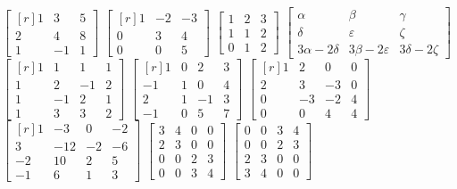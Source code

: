 \begin{tasks}[
    start=108,
    style=enumerate,
    label-offset = 5mm,
    ]
    \task $\begin{bmatrix*}[r]1 & 3 & 5 \\ 2 & 4 & 8 \\ 1 & -1 & 1\end{bmatrix*}$
    \task $\begin{bmatrix*}[r]1 & -2 & -3 \\ 0 & 3 & 4 \\ 0 & 0 & 5\end{bmatrix*}$
    \task $\begin{bmatrix*}1 & 2 & 3 \\ 1 & 1 & 2 \\ 0 & 1 & 2\end{bmatrix*}$
    \task $\begin{bmatrix*}\alpha & \beta & \gamma \\ \delta & \varepsilon & \zeta \\ 3 \alpha-2 \delta & 3 \beta-2 \varepsilon & 3 \delta-2 \zeta\end{bmatrix*}$
    \task $\begin{bmatrix*}[r]1 & 1 & 1 & 1 \\ 1 & 2 & -1 & 2 \\ 1 & -1 & 2 & 1 \\ 1 & 3 & 3 & 2\end{bmatrix*}$
    \task $\begin{bmatrix*}[r]1 & 0 & 2 & 3 \\ -1 & 1 & 0 & 4 \\ 2 & 1 & -1 & 3 \\ -1 & 0 & 5 & 7\end{bmatrix*}$
    \task $\begin{bmatrix*}[r]1 & 2 & 0 & 0 \\ 2 & 3 & -3 & 0 \\ 0 & -3 & -2 & 4 \\ 0 & 0 & 4 & 4\end{bmatrix*}$
    \task $\begin{bmatrix*}[r]1 & -3 & 0 & -2 \\ 3 & -12 & -2 & -6 \\ -2 & 10 & 2 & 5 \\ -1 & 6 & 1 & 3\end{bmatrix*}$
    \task $\begin{bmatrix*}3 & 4 & 0 & 0 \\ 2 & 3 & 0 & 0 \\ 0 & 0 & 2 & 3 \\ 0 & 0 & 3 & 4\end{bmatrix*}$
    \task $\begin{bmatrix*}0 & 0 & 3 & 4 \\ 0 & 0 & 2 & 3 \\ 2 & 3 & 0 & 0 \\ 3 & 4 & 0 & 0\end{bmatrix*}$
\end{tasks}
